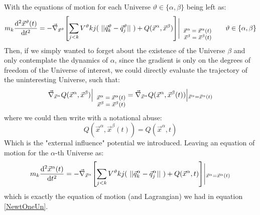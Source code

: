 \documentclass[11pt, a4paper]{article} %
\begin{document}
{With the equations of motion for each Universe $\vartheta\in\{\alpha, \beta\}$ being left as:
\begin{equation}
m_k \dv[2]{\vec{x}^\vartheta(t)}{t} = -\vec{\nabla}_{\vec{x}^\vartheta}\qty[\sum_{j< k} V^\vartheta{kj}(\ ||\vec{q}^\vartheta_k-\vec{q}^\vartheta_j||\ )+ Q(\vec{x}^\alpha, \vec{x}^\beta)]{\Bigg\rvert}\null_{  \footnotesize    \begin{array}{r@{}}
\vec{x}^\alpha=\vec{x}^\alpha(t)\\\vec{x}^\beta=\vec{x}^\beta(t) \end{array}}\quad\quad \vartheta\in\{\alpha, \beta\}
\end{equation}
Then, if we simply wanted to forget about the existence of the Universe $\beta$ and only contemplate the dynamics of $\alpha$, since the gradient is only on the degrees of freedom of the Universe of interest, we could directly evaluate the trajectory of the uninteresting Universe, such that:
\begin{equation}\label{trick1}
\vec{\nabla}_{\vec{x}^\alpha}Q(\vec{x}^\alpha, \vec{x}^\beta){\Big\rvert}\null_{  \footnotesize    \begin{array}{r@{}}
\vec{x}^\alpha=\vec{x}^\alpha(t)\\\vec{x}^\beta=\vec{x}^\beta(t) \end{array}}=\vec{\nabla}_{\vec{x}^\alpha}Q(\vec{x}^\alpha, \vec{x}^\beta(t)){\Big\rvert}\null_{ \vec{x}^\alpha=\vec{x}^\alpha(t) }
\end{equation}
where we could then write with a notational abuse:
\begin{equation}\label{trick2}
Q(\vec{x}^\alpha, \vec{x}^\beta(t))=Q(\vec{x}^\alpha, t)
\end{equation}
Which is the "external influence" potential we introduced. Leaving an equation of motion for the $\alpha$-th Universe as:
\begin{equation}
m_k \dv[2]{\vec{x}^\alpha(t)}{t} = -\vec{\nabla}_{\vec{x}^\alpha}\qty[\sum_{j< k} V^\vartheta{kj}(\ ||\vec{q}^\alpha_k-\vec{q}^\alpha_j||\ )+ Q(\vec{x}^\alpha,t)]{\Bigg\rvert}\null_{
\vec{x}^\alpha=\vec{x}^\alpha(t)}
\end{equation}
which is exactly the equation of motion (and Lagrangian) we had in equation \eqref{NewtOneUn}.\\

}
\end{document}
